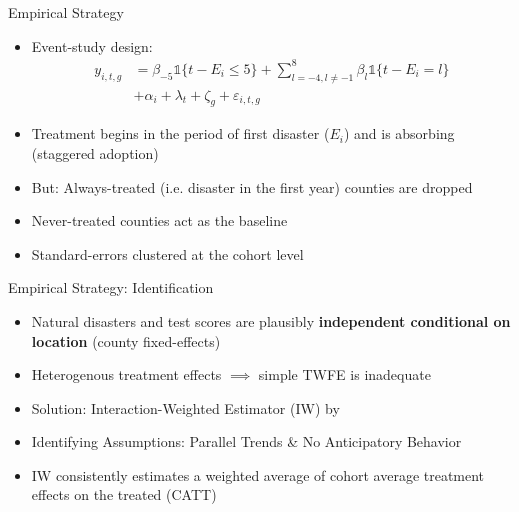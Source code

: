 \documentclass[hyperref={colorlinks = true,linkcolor = blue, citecolor=blue,urlcolor=blue}]{beamer}
\begin{document}
\begin{frame}{Empirical Strategy}
	\begin{itemize}
		\item Event-study design:
		\begin{align*}
			y_{i, t, g} &= \beta_{-5}  \mathds{1}\{t - E_i \leq 5\} + \sum_{l = -4, l \neq -1}^{8} \beta_l \mathds{1}\{t - E_i = l\} \\ &+ \alpha_i + \lambda_t + \zeta_g + \varepsilon_{i, t, g}
		\end{align*}
		\item Treatment begins in the period of first disaster ($E_i$) and is absorbing (staggered adoption)
		\item But: Always-treated (i.e. disaster in the first year) counties are dropped
		\item Never-treated counties act as the baseline
		\item Standard-errors clustered at the cohort level \citep{Abadie_2017}
	\end{itemize}
\end{frame}

\begin{frame}{Empirical Strategy: Identification}
	\begin{itemize}
		\item Natural disasters and test scores are plausibly \textbf{independent conditional on location} (county fixed-effects)
		\item Heterogenous treatment effects $\implies$ simple TWFE is inadequate \citep{deChaisemartin_2020, Sun_2021}
		\item Solution: Interaction-Weighted Estimator (IW) by \cite{Sun_2021}
		\item Identifying Assumptions: Parallel Trends \& No Anticipatory Behavior
		\item IW consistently estimates a weighted average of cohort average treatment effects on the treated (CATT)
	\end{itemize}
\end{frame}
\end{document}
